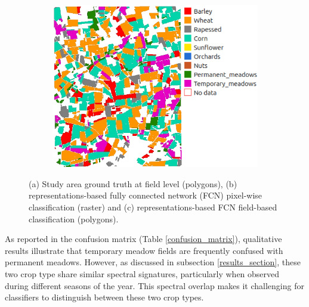\documentclass[journal,article,submit,pdftex,moreauthors]{Definitions/mdpi}
\begin{document}
\begin{figure}[H]
\begin{subfigure}[t]{0.3\linewidth}
	\caption{}
	\label{fig:classification_pixel_level}
	\end{subfigure}\hspace{-6.5mm} 
	\begin{subfigure}[t]{0.3\linewidth}
	\centering
    \includegraphics[height=\linewidth]{figures/aes_1_layer_mse_results/classification_maps/prediction_polygon_base_with_labels.png}
	  \caption{}
	  \label{fig:classification_map_field}
	\end{subfigure}
	\caption{(a) Study area ground truth at field level (polygons), (b) representations-based fully connected network (FCN) pixel-wise classification (raster) and (c) representations-based FCN field-based classification (polygons).}
	\label{fig:maps}
\end{figure}

As reported in the confusion matrix (Table \ref{confusion_matrix}), qualitative results illustrate that temporary meadow fields are frequently confused with permanent meadows. However, as discussed in subsection \ref{results_section}, these two crop type share similar spectral signatures, particularly when observed during different seasons of the year. This spectral overlap makes it challenging for classifiers to distinguish between these two crop types. 
\end{document}
